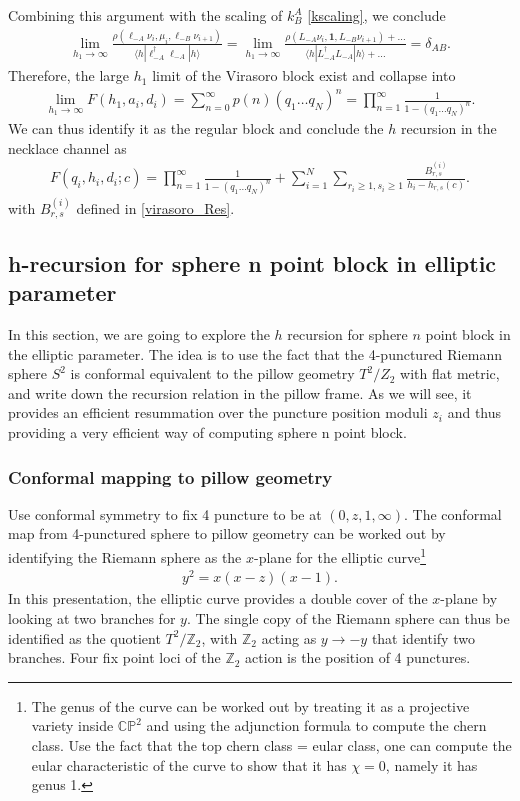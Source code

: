 \documentclass[12pt]{article}
\newcommand{\ie}{\begin{equation}\begin{aligned}}
\newcommand{\fe}{\end{aligned}\end{equation}}
\numberwithin{equation}{section}
\begin{document}
Combining this argument with the scaling of $k^A_B$ \eqref{kscaling}, we conclude
\ie
\lim_{h_1\rightarrow \infty} \frac{\rho(\ell_{-A}\nu_i,\mu_i,\ell_{-B}\nu_{i+1})}{\langle h| \ell_{-A}^\dagger \ell_{-A} |h\rangle}=\lim_{h_1\rightarrow \infty} \frac{\rho(L_{-A}\nu_i,\mathbf{1},L_{-B}\nu_{i+1} )+\dots}{\langle h| L_{-A}^\dagger L_{-A} |h\rangle+\dots} = \delta_{AB}.
\fe
Therefore, the large $h_1$ limit of the Virasoro block exist and collapse into 
\ie
\lim_{h_1\rightarrow \infty} F(h_1,a_i,d_i)= \sum_{n=0}^{\infty} p(n) (q_1\dots q_N)^n= \prod_{n=1}^{\infty} \frac{1}{1-(q_1\dots q_N)^n}.
\fe
We can thus identify it as the regular block and conclude the $h$ recursion in the necklace channel as
\ie
F(q_i,h_i,d_i;c)= \prod_{n=1}^{\infty} \frac{1}{1-(q_1\dots q_N)^n} + \sum_{i=1}^N \sum_{r_i\geq 1, s_i\geq 1}\frac{B^{(i)}_{r,s}}{h_i- h_{r,s}(c)}.
\fe
with $B^{(i)}_{r,s}$ defined in \eqref{virasoro_Res}.

\subsection{h-recursion for sphere n point block in elliptic parameter}

In this section, we are going to explore the $h$ recursion for sphere $n$ point block in the elliptic parameter. The idea is to use the fact that the 4-punctured Riemann sphere $S^2$ is conformal equivalent to the pillow geometry $T^2/Z_2$ with flat metric, and write down the recursion relation in the pillow frame. As we will see, it provides an efficient resummation over the puncture position moduli $z_i$ and thus providing a very efficient way of computing sphere n point block.

\subsubsection*{Conformal mapping to pillow geometry}

Use conformal symmetry to fix 4 puncture to be at $(0,z,1,\infty)$.  The conformal map from 4-punctured sphere to pillow geometry can be worked out by identifying the Riemann sphere as the $x$-plane for the elliptic curve\footnote{The genus of the curve can be worked out by treating it as a projective variety inside $\mathbb{CP}^2$ and using the adjunction formula to compute the chern class. Use the fact that the top chern class = eular class, one can compute the eular characteristic of the curve to show that it has $\chi= 0$, namely it has genus 1.}
\ie
y^2= x(x-z)(x-1).
\fe
In this presentation, the elliptic curve provides a double cover of the $x$-plane by looking at two branches for $y$. The single copy of the Riemann sphere can thus be identified as the quotient $T^2/\mathbb{Z}_2$, with $\mathbb{Z}_2$ acting as $y\rightarrow -y$ that identify two branches. Four fix point loci of the $\mathbb{Z}_2 $ action is the position of 4 punctures. 
\end{document}
